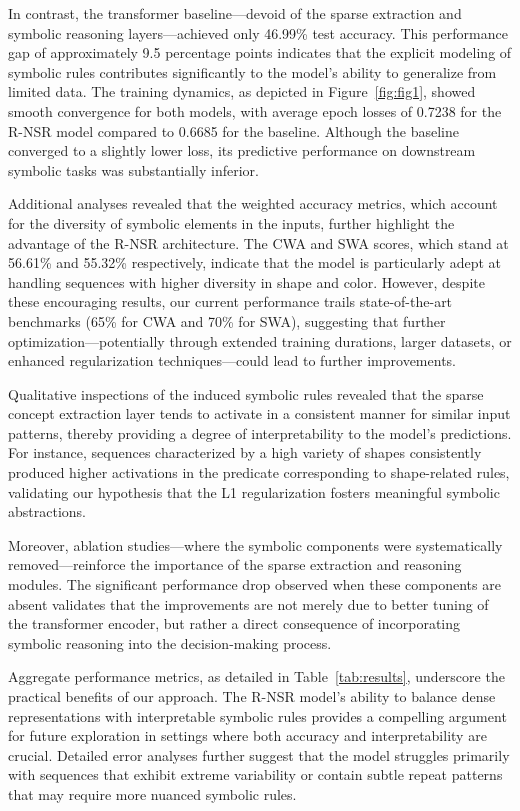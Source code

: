 \documentclass{article}
\begin{document}
In contrast, the transformer baseline—devoid of the sparse extraction and symbolic reasoning layers—achieved only 46.99\% test accuracy. This performance gap of approximately 9.5 percentage points indicates that the explicit modeling of symbolic rules contributes significantly to the model's ability to generalize from limited data. The training dynamics, as depicted in Figure~\ref{fig:fig1}, showed smooth convergence for both models, with average epoch losses of 0.7238 for the R-NSR model compared to 0.6685 for the baseline. Although the baseline converged to a slightly lower loss, its predictive performance on downstream symbolic tasks was substantially inferior.

Additional analyses revealed that the weighted accuracy metrics, which account for the diversity of symbolic elements in the inputs, further highlight the advantage of the R-NSR architecture. The CWA and SWA scores, which stand at 56.61\% and 55.32\% respectively, indicate that the model is particularly adept at handling sequences with higher diversity in shape and color. However, despite these encouraging results, our current performance trails state-of-the-art benchmarks (65\% for CWA and 70\% for SWA), suggesting that further optimization—potentially through extended training durations, larger datasets, or enhanced regularization techniques—could lead to further improvements.

Qualitative inspections of the induced symbolic rules revealed that the sparse concept extraction layer tends to activate in a consistent manner for similar input patterns, thereby providing a degree of interpretability to the model’s predictions. For instance, sequences characterized by a high variety of shapes consistently produced higher activations in the predicate corresponding to shape-related rules, validating our hypothesis that the L1 regularization fosters meaningful symbolic abstractions.

Moreover, ablation studies—where the symbolic components were systematically removed—reinforce the importance of the sparse extraction and reasoning modules. The significant performance drop observed when these components are absent validates that the improvements are not merely due to better tuning of the transformer encoder, but rather a direct consequence of incorporating symbolic reasoning into the decision-making process.

Aggregate performance metrics, as detailed in Table~\ref{tab:results}, underscore the practical benefits of our approach. The R-NSR model’s ability to balance dense representations with interpretable symbolic rules provides a compelling argument for future exploration in settings where both accuracy and interpretability are crucial. Detailed error analyses further suggest that the model struggles primarily with sequences that exhibit extreme variability or contain subtle repeat patterns that may require more nuanced symbolic rules.
\end{document}
